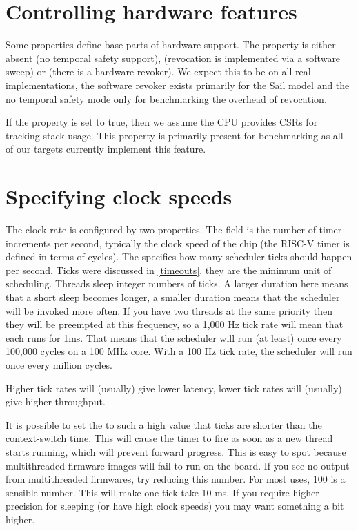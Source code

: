 \section{Controlling hardware features}

Some properties define base parts of hardware support.
The  property is either absent (no temporal safety support),  (revocation is implemented via a software sweep) or  (there is a hardware revoker).
We expect this to be  on all real implementations, the software revoker exists primarily for the Sail model and the no temporal safety mode only for benchmarking the overhead of revocation.

If the  property is set to true, then we assume the CPU provides CSRs for tracking stack usage.
This property is primarily present for benchmarking as all of our targets currently implement this feature.

\section{Specifying clock speeds}

The clock rate is configured by two properties.
The  field is the number of timer increments per second, typically the clock speed of the chip (the RISC-V timer is defined in terms of cycles).
The  specifies how many scheduler ticks should happen per second.
Ticks were discussed in \ref{timeouts}, they are the minimum unit of scheduling.
Threads sleep integer numbers of ticks.
A larger duration here means that a short sleep becomes longer, a smaller duration means that the scheduler will be invoked more often.
If you have two threads at the same priority then they will be preempted at this frequency, so a 1,000 Hz tick rate will mean that each runs for 1ms.
That means that the scheduler will run (at least) once every 100,000 cycles on a 100 MHz core.
With a 100 Hz tick rate, the scheduler will run once every million cycles.

Higher tick rates will (usually) give lower latency, lower tick rates will (usually) give higher throughput.

\begin{warning}
	It is possible to set the  to such a high value that ticks are shorter than the context-switch time.
	This will cause the timer to fire as soon as a new thread starts running, which will prevent forward progress.
	This is easy to spot because multithreaded firmware images will fail to run on the board.
	If you see no output from multithreaded firmwares, try reducing this number.
	For most uses, 100 is a sensible number.
	This will make one tick take 10 ms.
	If you require higher precision for sleeping (or have high clock speeds) you may want something a bit higher.
\end{warning}

